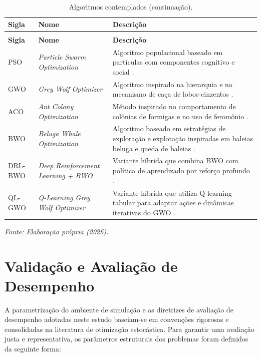 \documentclass[12pt, a4paper, oneside]{report}
\begin{document}
\begin{longtable}{p{2cm} p{5.0cm} p{8.0cm}} 
\caption{Algoritmos contemplados.} \label{tab:algoritmos-plataforma} \\
\toprule 
\textbf{Sigla} & \textbf{Nome} & \textbf{Descrição}\\ 
\midrule \endfirsthead 
\caption[]{Algoritmos contemplados (continuação).} \\
\toprule \textbf{Sigla} & \textbf{Nome} & \textbf{Descrição}\\ \midrule \endhead 
PSO & \textit{Particle Swarm Optimization} & Algoritmo populacional baseado em partículas com componentes cognitivo e social \citep{kennedy1995particle}.\\ 
GWO & \textit{Grey Wolf Optimizer} & Algoritmo inspirado na hierarquia e no mecanismo de caça de lobos-cinzentos \citep{mirjalili2014grey}.\\ 
ACO & \textit{Ant Colony Optimization} & Método inspirado no comportamento de colônias de formigas e no uso de feromônio \citep{dorigo2004ant}.\\ 
BWO & \textit{Beluga Whale Optimization} & Algoritmo baseado em estratégias de exploração e explotação inspiradas em baleias beluga e queda de baleias \citep{zhong2022beluga}.\\ 
DRL-BWO & \textit{Deep Reinforcement Learning + BWO} & Variante híbrida que combina BWO com política de aprendizado por reforço profundo \citep{praveena2022optimal}.\\ 
QL-GWO & \textit{Q-Learning Grey Wolf Optimizer} & Variante híbrida que utiliza Q-learning tabular para adaptar ações e dinâmicas iterativas do GWO \citep{nayeem2025adaptive}.\\ 
\bottomrule 
\end{longtable}
\vspace{-0.5cm}
\centerline{\small \textit{Fonte: Elaboração própria (2026).}}
\vspace{0.5cm}

\section{Validação e Avaliação de Desempenho}

A parametrização do ambiente de simulação e as diretrizes de avaliação de desempenho adotadas neste estudo baseiam-se em convenções rigorosas e consolidadas na literatura de otimização estocástica. Para garantir uma avaliação justa e representativa, os parâmetros estruturais dos problemas foram definidos da seguinte forma:
\end{document}
